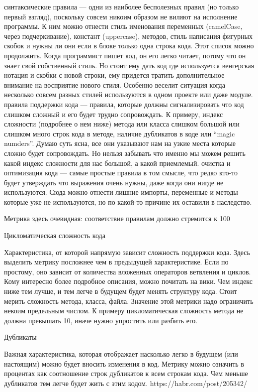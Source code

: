 \documentclass{../industrial-development}
\begin{document}
синтаксические правила — одни из наиболее бесполезных правил (но только первый взгляд), поскольку совсем никоим образом не виляют на исполнение программы. К ним можно отнести стиль именования переменных (camelCase, через подчеркивание), констант (uppercase), методов, стиль написания фигурных скобок и нужны ли они если в блоке только одна строка кода. Этот список можно продолжить. Когда программист пишет код, он его легко читает, потому что он знает свой собственный стиль. Но стоит ему дать код где используется венгерская нотация и скобки с новой строки, ему придется тратить дополнительное внимание на восприятие нового стиля. Особенно веселит ситуация когда несколько совсем разных стилей используются в одном проекте или даже модуле.
правила поддержки кода — правила, которые должны сигнализировать что код слишком сложный и его будет трудно сопровождать. К примеру, индекс сложности (подробнее о нем ниже) метода или класса слишком большой или слишком много строк кода в методе, наличие дубликатов в коде или “magic numders”. Думаю суть ясна, все они указывают нам на узкие места которые сложно будет сопровождать. Но нельзя забывать что именно мы можем решить какой индекс сложности для нас большой, а какой приемлемый.
очистка и оптимизация кода — самые простые правила в том смысле, что редко кто-то будет утверждать что выражения очень нужны, даже когда они нигде не используются. Сюда можно отнести лишние импорты, переменные и методы которые уже не используются, но по какой-то причине их оставили в наследство.


Метрика здесь очевидная: соответствие правилам должно стремится к 100%

Цикломатическая сложность кода

Характеристика, от которой напрямую зависит сложность поддержки кода. Здесь выделить метрику посложнее чем в предыдущей характеристике. Если по простому, оно зависит от количества вложенных операторов ветвления и циклов. Кому интересно более подробное описания, можно почитать на вики. Чем индекс ниже тем лучше, и тем легче в будущем будет менять структуру кода. Стоит мерить сложность метода, класса, файла. Значение этой метрики надо ограничить некоим предельным числом. К примеру цикломатическая сложность метода не должна превышать 10, иначе нужно упростить или разбить его.

Дубликаты

Важная характеристика, которая отображает насколько легко в будущем (или настоящим) можно будет вносить изменения в код. Метрику можно означить в процентах как соотношение строк дубликатов к всем строкам кода. Чем меньше дубликатов тем легче будет жить с этим кодом.
https://habr.com/post/205342/
\end{document}
